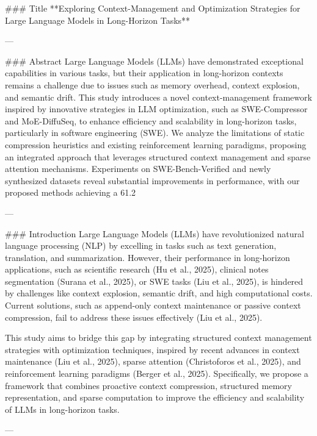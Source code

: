 ### Title  
**Exploring Context-Management and Optimization Strategies for Large Language Models in Long-Horizon Tasks**

---

### Abstract  
Large Language Models (LLMs) have demonstrated exceptional capabilities in various tasks, but their application in long-horizon contexts remains a challenge due to issues such as memory overhead, context explosion, and semantic drift. This study introduces a novel context-management framework inspired by innovative strategies in LLM optimization, such as SWE-Compressor and MoE-DiffuSeq, to enhance efficiency and scalability in long-horizon tasks, particularly in software engineering (SWE). We analyze the limitations of static compression heuristics and existing reinforcement learning paradigms, proposing an integrated approach that leverages structured context management and sparse attention mechanisms. Experiments on SWE-Bench-Verified and newly synthesized datasets reveal substantial improvements in performance, with our proposed methods achieving a 61.2%

---

### Introduction  
Large Language Models (LLMs) have revolutionized natural language processing (NLP) by excelling in tasks such as text generation, translation, and summarization. However, their performance in long-horizon applications, such as scientific research (Hu et al., 2025), clinical notes segmentation (Surana et al., 2025), or SWE tasks (Liu et al., 2025), is hindered by challenges like context explosion, semantic drift, and high computational costs. Current solutions, such as append-only context maintenance or passive context compression, fail to address these issues effectively (Liu et al., 2025).  

This study aims to bridge this gap by integrating structured context management strategies with optimization techniques, inspired by recent advances in context maintenance (Liu et al., 2025), sparse attention (Christoforos et al., 2025), and reinforcement learning paradigms (Berger et al., 2025). Specifically, we propose a framework that combines proactive context compression, structured memory representation, and sparse computation to improve the efficiency and scalability of LLMs in long-horizon tasks.

---

